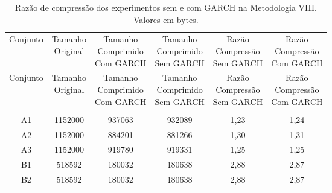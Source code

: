\begin{center}
\begin{longtable}{cccccc}
\toprule
\rowcolor{white}
\caption[Metodologia VIII: Razão de compressão]{Razão de compressão dos
experimentos sem e com GARCH na Metodologia VIII.
Valores em bytes.} \label{Tab:razaocompressaoMet} \\
\midrule
Conjunto & \specialcell{Tamanho \\Original} & \specialcell{Tamanho
\\Comprimido\\Com GARCH} & \specialcell{Tamanho
\\Comprimido\\Sem GARCH} & \specialcell{Razão \\Compressão
\\Sem GARCH} & \specialcell{Razão \\Compressão
\\Com GARCH} \\
\midrule
\endfirsthead
\midrule
\rowcolor{white}
Conjunto & \specialcell{Tamanho \\Original} & \specialcell{Tamanho
\\Comprimido\\Com GARCH} & \specialcell{Tamanho
\\Comprimido\\Sem GARCH} & \specialcell{Razão \\Compressão
\\Sem GARCH} & \specialcell{Razão \\Compressão
\\Com GARCH} \\
\toprule
\endhead
\midrule \\ %
\endfoot
\bottomrule
\endlastfoot
    A1    & 1152000 & 937063 & 932089 & 1,23  & 1,24 \\
    A2    & 1152000 & 884201 & 881266 & 1,30  & 1,31 \\
    A3    & 1152000 & 919780 & 919331 & 1,25  & 1,25 \\
    B1    & 518592 & 180032 & 180638 & 2,88  & 2,87 \\
    B2    & 518592 & 180032 & 180638 & 2,88  & 2,87 \\

\end{longtable}
\end{center}
